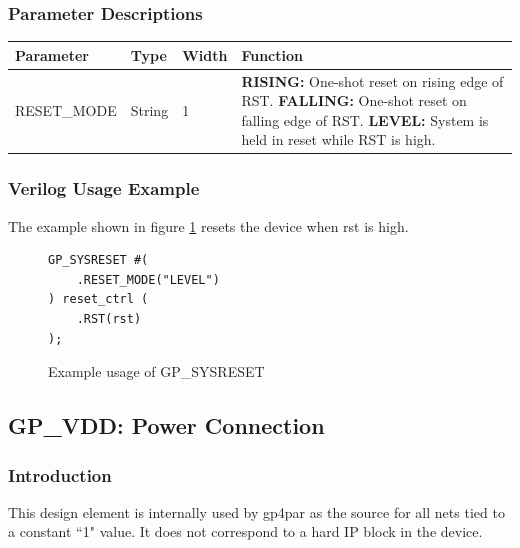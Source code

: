 \documentclass[11pt]{article}
\begin{document}
\subsubsection{Parameter Descriptions}

\begin{tabularx}{5in}{|l|l|l|X|}
\hline
{\bfseries Parameter} & {\bfseries Type} & {\bfseries Width} & {\bfseries Function} \\
\hline
RESET\_MODE & String & 1 & 
	{\bfseries RISING: } \newline One-shot reset on rising edge of RST. \newline
	{\bfseries FALLING: } \newline One-shot reset on falling edge of RST. \newline
	{\bfseries LEVEL: } \newline System is held in reset while RST is high.\\
\hline
\end{tabularx}

\subsubsection{Verilog Usage Example}

The example shown in figure \ref{gp-sysreset-example} resets the device when rst is high.

\begin{figure}[h]
\begin{lstlisting}
GP_SYSRESET #(
	.RESET_MODE("LEVEL")
) reset_ctrl (
	.RST(rst)
);
\end{lstlisting}
\caption{Example usage of GP\_SYSRESET}
\label{gp-sysreset-example}
\end{figure}


\FloatBarrier
\pagebreak
\subsection{GP\_VDD: Power Connection}

\subsubsection{Introduction}
This design element is internally used by gp4par as the source for all nets tied to a constant ``1" value. It does not 
correspond to a hard IP block in the device.
\end{document}
